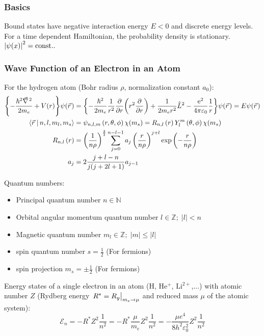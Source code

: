 		\subsubsection{Basics}
			\noindent
			Bound states have negative interaction energy $E<0$ and discrete energy levels. For a time dependent Hamiltonian, the probability density is stationary.
			 $\left|\psi(x)\right|^2=\mathrm{const.}.$

		\subsubsection{Wave Function of an Electron in an Atom}
			\noindent
			For the hydrogen atom (Bohr radius $\rho$, normalization constant $a_0$):
			\begin{equation}
				\begin{aligned}
					\qty{-\frac{\hbar^2 \Nabla^2}{2 m_e} + V(r)}\psi(\vec{r})
					&= \qty{-\frac{\hbar^2}{2 m_e}\frac{1}{r^2}\pdv{r}\qty(r^2\pdv{r}) + \frac{1}{2 m_e r^2} \hat{L}^2 - \frac{\ex^2}{4\pi\varepsilon_0}\frac{1}{r}}\psi(\vec{r})
					= E \psi\qty(\vec{r})
					\\
					\Braket{\vec{r}|n,l,m_l,m_s} &= \psi_{n,l,m}\left(r,\theta,\phi\right)\chi(m_s)
					= R_{n,l}\left(r\right) Y_l^m\left(\theta,\phi\right)\chi(m_s) \\
					R_{n,l}\left(r\right)
					&= \left(\frac{1}{n\rho}\right)^{\frac{3}{2}}
					\sum_{j=0}^{n-l-1} a_j \left(\frac{r}{n\rho}\right)^{j+l} \exp\left({-\frac{r}{n\rho}}\right) \\
					a_j &= 2\frac{j+l-n}{j(j+2l+1)} a_{j-1} \\
				\end{aligned}
			\end{equation}

			\noindent
			Quantum numbers:
			\begin{itemize}
				\item Principal quantum number $n \in \mathbb{N}$
				\item Orbital angular momentum quantum number $l \in \mathbb{Z};\; \left|l\right| < n$
				\item Magnetic quantum number $m_l \in \mathbb{Z};\; \left|m\right| \le \left|l\right|$
				\item spin quantum number $s = \frac{1}{2}$ (For fermions)
				\item spin projection $m_s = \pm \frac{1}{2}$ (For fermions)
			\end{itemize}

			\noindent
			Energy states of a single electron in an atom ($\mathrm{H}$, $\mathrm{He^{+}}$, $\mathrm{Li^{2+}}$,...) with atomic number $Z$ (Rydberg energy $\eval{R^*=R_y}_{m_e\rightarrow \mu}$ and reduced mass $\mu$ of the atomic system):
			\begin{equation}
				\mathcal{E}_n = -R^* Z^2 \frac{1}{n^2} = -R^* \frac{\mu}{m_e} Z^2 \frac{1}{n^2} = - \frac{\mu e^4}{8 h^2 \varepsilon_0^2} Z^2 \frac{1}{n^2}
			\end{equation}

